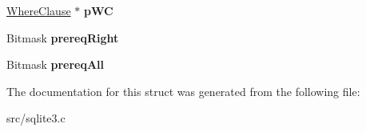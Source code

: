 \begin{DoxyCompactItemize}
\item 
\hypertarget{struct_where_term_a1fb0a9ede5a12d6d2f7886431b348fb3}{\hyperlink{struct_where_clause}{Where\-Clause} $\ast$ {\bfseries p\-W\-C}}\label{struct_where_term_a1fb0a9ede5a12d6d2f7886431b348fb3}

\item 
\hypertarget{struct_where_term_a1274011fa1ef0639284b7944f4570e67}{Bitmask {\bfseries prereq\-Right}}\label{struct_where_term_a1274011fa1ef0639284b7944f4570e67}

\item 
\hypertarget{struct_where_term_a49b700336b005067352366cfc40de07f}{Bitmask {\bfseries prereq\-All}}\label{struct_where_term_a49b700336b005067352366cfc40de07f}

\end{DoxyCompactItemize}


The documentation for this struct was generated from the following file\-:\begin{DoxyCompactItemize}
\item 
src/sqlite3.\-c\end{DoxyCompactItemize}
